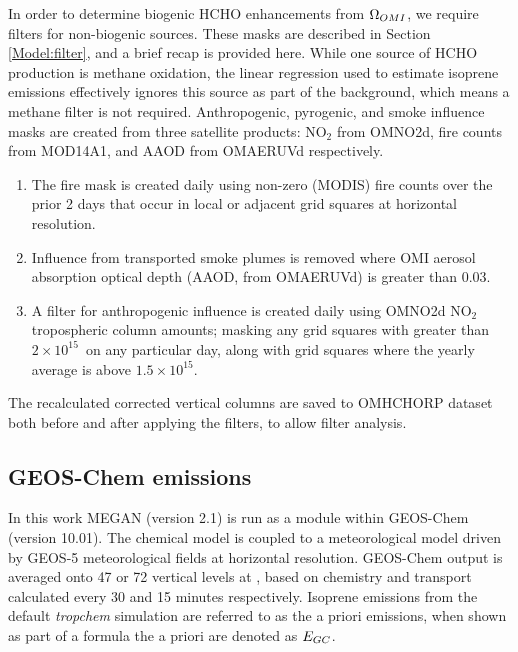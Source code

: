     In order to determine biogenic HCHO enhancements from $\Omega_{OMI}$, we require filters for non-biogenic sources.
    These masks are described in Section \ref{Model:filter}, and a brief recap is provided here.
    While one source of HCHO production is methane oxidation, the linear regression used to estimate isoprene emissions effectively ignores this source as part of the background, which means a methane filter is not required.
    Anthropogenic, pyrogenic, and smoke influence masks are created from three satellite products: NO$_2$ from OMNO2d, fire counts from MOD14A1, and AAOD from OMAERUVd respectively.
    \begin{enumerate}
      \item 
      The fire mask is created daily using non-zero (MODIS) fire counts over the prior 2 days that occur in local or adjacent grid squares at \highhr horizontal resolution.
      \item 
      Influence from transported smoke plumes is removed where OMI aerosol absorption optical depth (AAOD, from OMAERUVd) is greater than 0.03.
      \item 
      A filter for anthropogenic influence is created daily using OMNO2d NO$_2$ tropospheric column amounts; masking any grid squares with greater than $2\times 10^{15}$\moleccm ~on any particular day, along with grid squares where the yearly average is above $1.5 \times 10^{15}$\moleccm.
    \end{enumerate}
    The recalculated corrected vertical columns are saved to OMHCHORP dataset both before and after applying the filters, to allow filter analysis.
    
    
  \subsection{GEOS-Chem emissions}
    
    In this work MEGAN (version 2.1) is run as a module within GEOS-Chem (version 10.01).
    The chemical model is coupled to a meteorological model driven by GEOS-5 meteorological fields at \highhr horizontal resolution.
    GEOS-Chem output is averaged onto 47 or 72 vertical levels at \lowhr, based on chemistry and transport calculated every 30 and 15 minutes respectively.
    Isoprene emissions from the default \textit{tropchem} simulation are referred to as the a priori emissions, when shown as part of a formula the a priori are denoted as $E_{GC}$.
    

